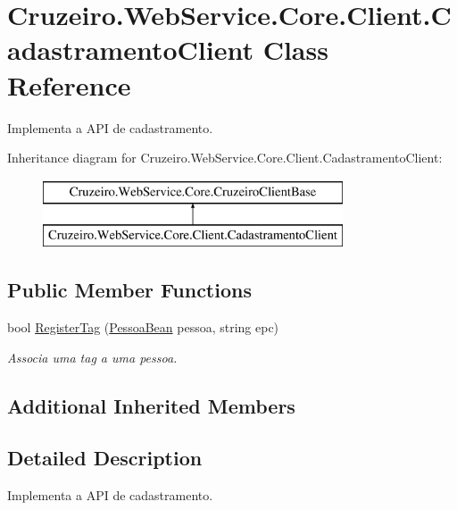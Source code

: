\hypertarget{class_cruzeiro_1_1_web_service_1_1_core_1_1_client_1_1_cadastramento_client}{}\section{Cruzeiro.\+Web\+Service.\+Core.\+Client.\+Cadastramento\+Client Class Reference}
\label{class_cruzeiro_1_1_web_service_1_1_core_1_1_client_1_1_cadastramento_client}


Implementa a A\+PI de cadastramento.  


Inheritance diagram for Cruzeiro.\+Web\+Service.\+Core.\+Client.\+Cadastramento\+Client\+:\begin{figure}[H]
\begin{center}
\leavevmode
\includegraphics[height=2.000000cm]{class_cruzeiro_1_1_web_service_1_1_core_1_1_client_1_1_cadastramento_client}
\end{center}
\end{figure}
\subsection*{Public Member Functions}
\begin{DoxyCompactItemize}
\item 
bool \hyperlink{class_cruzeiro_1_1_web_service_1_1_core_1_1_client_1_1_cadastramento_client_a582b75067aec0ec1b8f02e7dd6f871f4}{Register\+Tag} (\hyperlink{class_cruzeiro_1_1_core_1_1_model_1_1_beans_1_1_pessoa_bean}{Pessoa\+Bean} pessoa, string epc)
\begin{DoxyCompactList}\small\item\em Associa uma tag a uma pessoa. \end{DoxyCompactList}\end{DoxyCompactItemize}
\subsection*{Additional Inherited Members}


\subsection{Detailed Description}
Implementa a A\+PI de cadastramento. 

